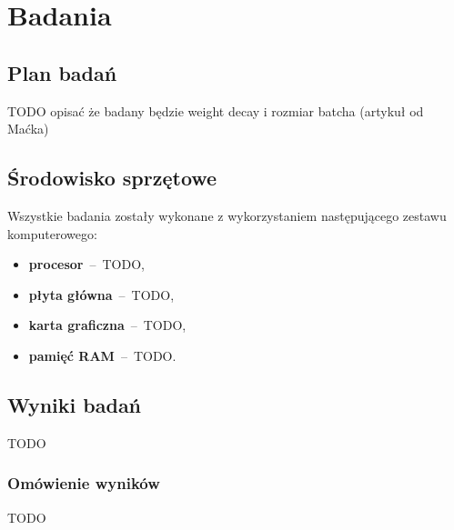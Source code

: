 \chapter{Badania}

\section{Plan badań}
TODO opisać że badany będzie weight decay i rozmiar batcha (artykuł od Maćka)

\section{Środowisko sprzętowe}
Wszystkie badania zostały wykonane z wykorzystaniem następującego zestawu komputerowego:
\begin{itemize}
    \item \textbf{procesor}~--~TODO,
    \item \textbf{płyta główna}~--~TODO,
    \item \textbf{karta graficzna}~--~TODO,
    \item \textbf{pamięć RAM}~--~TODO.
\end{itemize}

\section{Wyniki badań}
TODO

\subsection{Omówienie wyników}
TODO
